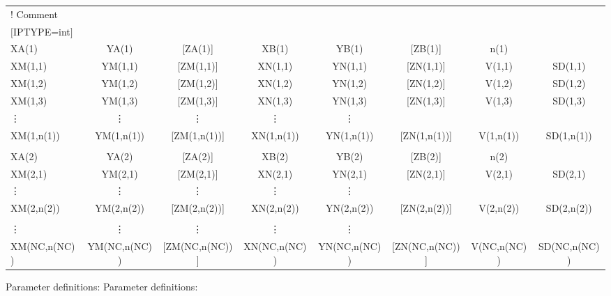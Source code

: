 \begin{adjustwidth}{-1in}{-1in} %
\begin{fileExample}\scriptsize
\begin{tabular}{|lccccccc|}
\hline
! Comment & & & & & & & \\
$[$IPTYPE=int$]$ & & & & & & & \\
XA(1)  & YA(1)  & [ZA(1)]  & XB(1)  & YB(1)  & [ZB(1)]  & n(1) & \\
XM(1,1)  & YM(1,1)  & [ZM(1,1)]  & XN(1,1)  & YN(1,1)  & [ZN(1,1)]  & V(1,1) & SD(1,1)\\
XM(1,2)  & YM(1,2)  & [ZM(1,2)]  & XN(1,2)  & YN(1,2)  & [ZN(1,2)]  & V(1,2) & SD(1,2) \\
XM(1,3)  & YM(1,3)  & [ZM(1,3)]  & XN(1,3)  & YN(1,3)  & [ZN(1,3)]  & V(1,3) & SD(1,3) \\
\vdots  & \vdots  & \vdots  & \vdots  & \vdots  & & & \\
XM(1,n(1))  & YM(1,n(1))  & [ZM(1,n(1))]  & XN(1,n(1))  & YN(1,n(1))  & [ZN(1,n(1))]  & V(1,n(1)) & SD(1,n(1)) \\
 & & & & & & & \\
XA(2)  & YA(2)  & [ZA(2)]  & XB(2)  & YB(2)  & [ZB(2)]  & n(2) & \\
XM(2,1)  & YM(2,1)  & [ZM(2,1)]  & XN(2,1)  & YN(2,1)  & [ZN(2,1)]  & V(2,1) & SD(2,1) \\
\vdots  & \vdots  & \vdots  & \vdots  & \vdots  & & & \\
XM(2,n(2))  & YM(2,n(2))  & [ZM(2,n(2))]  & XN(2,n(2))  & YN(2,n(2))  & [ZN(2,n(2))]  & V(2,n(2)) & SD(2,n(2)) \\
 & & & & & & & \\
\vdots  & \vdots  & \vdots  & \vdots  & \vdots  & & & \\
 XM(NC,n(NC)) & YM(NC,n(NC)) & [ZM(NC,n(NC))] & XN(NC,n(NC)) & YN(NC,n(NC)) & [ZN(NC,n(NC))] & V(NC,n(NC)) & SD(NC,n(NC))\\
\hline
\end{tabular}
\end{fileExample}
\end{adjustwidth}
%
Parameter definitions:
%
%
Parameter definitions:
%
